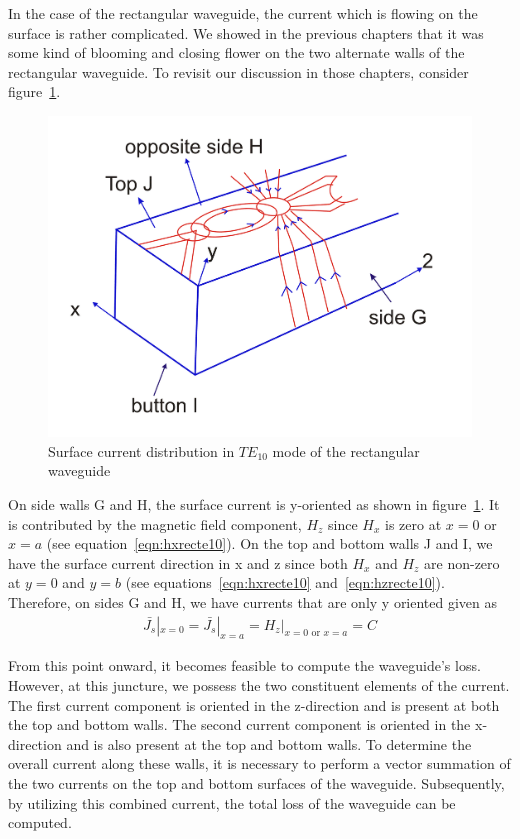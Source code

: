 In the case of the rectangular waveguide, the current which is flowing on the surface is rather complicated. We showed in the previous chapters that it was some kind of blooming and closing flower on the two alternate walls of the rectangular waveguide. To revisit our discussion in those chapters, consider figure~\ref{fig:lecture2-image-a}.
\begin{figure}[h]
\centering
\includegraphics[width=1\linewidth]{./graphics/lecture2-image-a.png}
\caption{Surface current distribution in $TE_{10}$ mode of the rectangular waveguide}
\label{fig:lecture2-image-a}
\end{figure}

On side walls G and H, the surface current is y-oriented as shown in figure~\ref{fig:lecture2-image-a}. It is contributed by the magnetic field component, $H_z$ since $H_x$ is zero at $x=0$ or $x=a$ (see equation~\eqref{eqn:hxrecte10}). On the top and bottom walls J and I, we have the surface current direction in x and z since both $H_x$ and $H_z$ are non-zero at $y=0$ and $y=b$ (see equations~\eqref{eqn:hxrecte10} and~\eqref{eqn:hzrecte10}). Therefore, on sides G and H, we have currents that are only y oriented given as
\begin{align*}
\bar{J_s}|_{x=0} = \bar{J_s}|_{x=a} = H_z|_{x=0\text{ or }x=a}=C
\end{align*}

From this point onward, it becomes feasible to compute the waveguide's loss. However, at this juncture, we possess the two constituent elements of the current. The first current component is oriented in the z-direction and is present at both the top and bottom walls. The second current component is oriented in the x-direction and is also present at the top and bottom walls. To determine the overall current along these walls, it is necessary to perform a vector summation of the two currents on the top and bottom surfaces of the waveguide. Subsequently, by utilizing this combined current, the total loss of the waveguide can be computed.

